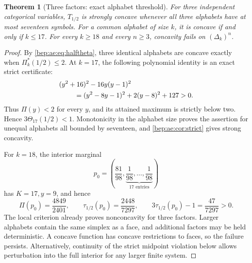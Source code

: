 \documentclass[11pt]{article}
\numberwithin{equation}{section}
\newtheorem{theorem}{Theorem}[section]
\theoremstyle{definition}
\theoremstyle{remark}
\begin{document}
\begin{theorem}[Three factors: exact alphabet threshold]\label{bep:ae:thm:17}
For three independent categorical variables, $T_{1/2}$ is strongly
concave whenever all three alphabets have at most seventeen symbols.
For a common alphabet of size $k$, it is concave if and only if $k\leq17$.
For every $k\geq18$ and every $n\geq3$, concavity fails on
$(\Delta_k)^n$.
\end{theorem}
\begin{proof}
By \eqref{bep:ae:eq:halftheta}, three identical alphabets are concave exactly
when $\Pi^{*}_k(1/2)\leq2$. At $k=17$, the following polynomial identity is
an exact strict certificate:
\begin{align}
 &(y^2+16)^2-16y(y-1)^2\notag\\
 &\hspace{8mm}=(y^2-8y-1)^2+2(y-8)^2+127>0.\label{bep:ae:eq:SOS17}
\end{align}
Thus $\Pi(y)<2$ for every $y$, and its attained maximum is strictly below
two. Hence $3\Theta_{17}(1/2)<1$. Monotonicity in the alphabet size
proves the assertion for unequal alphabets all bounded by seventeen,
and \cref{bep:ae:cor:strict} gives strong concavity.

For $k=18$, the interior marginal
\begin{equation}\label{bep:ae:eq:witnessp}
 p_0=\left(\frac{81}{98},\underbrace{\frac1{98},\ldots,
                                  \frac1{98}}_{17\text{ entries}}\right)
\end{equation}
has $K=17,y=9$, and hence
\begin{equation}\label{bep:ae:eq:witnessvalues}
 \Pi(p_0)=\frac{4849}{2401},\qquad
 \tau_{1/2}(p_0)=\frac{2448}{7297},\qquad
 3\tau_{1/2}(p_0)-1=\frac{47}{7297}>0.
\end{equation}
The local criterion already proves nonconcavity for three factors.
Larger alphabets contain the same simplex as a face, and additional
factors may be held deterministic. A concave function has concave
restrictions to faces, so the failure persists. Alternatively, continuity
of the strict midpoint violation below allows perturbation into the full
interior for any larger finite system.
\end{proof}
\end{document}
